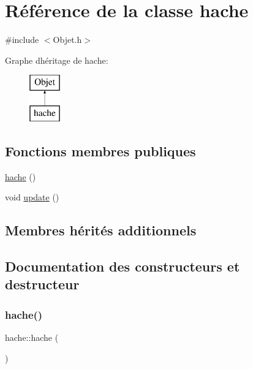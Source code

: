 \hypertarget{classhache}{}\section{Référence de la classe hache}
\label{classhache}


{\ttfamily \#include $<$Objet.\+h$>$}

Graphe d\textquotesingle{}héritage de hache\+:\begin{figure}[H]
\begin{center}
\leavevmode
\includegraphics[height=2.000000cm]{classhache}
\end{center}
\end{figure}
\subsection*{Fonctions membres publiques}
\begin{DoxyCompactItemize}
\item 
\hyperlink{classhache_aa48ac7a5b20fb97e50b49b8d02915b13}{hache} ()
\item 
void \hyperlink{classhache_a0b491958a8b90c3f6cc79e28e094a410}{update} ()
\end{DoxyCompactItemize}
\subsection*{Membres hérités additionnels}


\subsection{Documentation des constructeurs et destructeur}
\mbox{\label{classhache_aa48ac7a5b20fb97e50b49b8d02915b13}} 
\subsubsection{\texorpdfstring{hache()}{hache()}}
{\footnotesize\ttfamily hache\+::hache (\begin{DoxyParamCaption}{ }\end{DoxyParamCaption})\hspace{0.3cm}{\ttfamily [inline]}}



